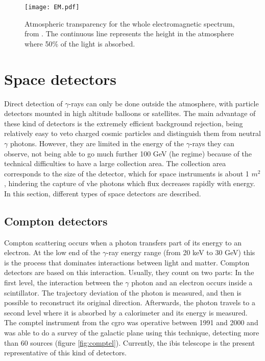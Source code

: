 \documentclass[main.tex]{subfiles}
\begin{document}
\begin{figure}[h]
\centering
 \texttt{[image: EM.pdf]}
  \caption{Atmospheric transparency for the whole electromagnetic spectrum, from \cite{highenergyastrophy}. The continuous line represents the height in the atmosphere where 50\% of the light is absorbed.}
    \label{fig:atmoabsorb}
\end{figure}


\section{Space detectors} \label{sec:spacedet}

Direct detection of $\gamma$-rays can only be done outside the atmosphere, with particle detectors mounted in high altitude balloons or satellites. The main advantage of these kind of detectors is the extremely efficient background rejection, being relatively easy to veto charged cosmic particles and distinguish them from neutral $\gamma$ photons. However, they are limited in the energy of the $\gamma$-rays they can observe, not being able to go much further 100 GeV (\gls{he} regime) because of the technical difficulties to have a large collection area. The collection area corresponds to the size of the detector, which for space instruments is about 1 $m^2$, hindering the capture of \gls{vhe} photons which flux decreases rapidly with energy.\\
In this section, different types of space detectors are described.\\

\subsection{Compton detectors}\label{sec:comptondetectors}

Compton scattering occurs when a photon transfers part of its energy to an electron. At the low end of the $\gamma$-ray energy range (from 20 keV to 30 GeV) this is the process that dominates interactions between light and matter. Compton detectors are based on this interaction. Usually, they count on two parts: In the first level, the interaction between the $\gamma$ photon and an electron occurs inside a scintillator. The trajectory deviation of the photon is measured, and then is possible to reconstruct its original direction. Afterwards, the photon travels to a second level where it is absorbed by a calorimeter and its energy is measured. The \gls{comptel} instrument from the \gls{cgro} was operative between 1991 and 2000 and was able to do a survey of the galactic plane using this technique, detecting more than 60 sources (figure \ref{fig:comptel}). Currently, the \gls{ibis} \cite{IBIS} telescope \cite{INTEGRAL} is the present representative of this kind of detectors.
\end{document}
